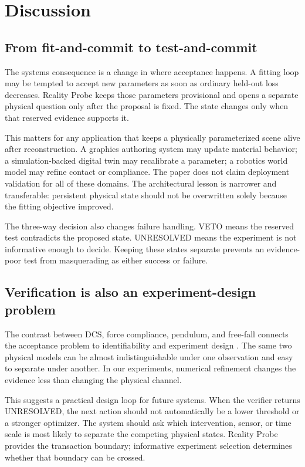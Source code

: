 \documentclass[acmtog]{acmart}
\begin{document}
\section{Discussion}\label{discussion}

\subsection{From fit-and-commit to test-and-commit}\label{why-the-channels-behave-differently}

The systems consequence is a change in where acceptance happens. A fitting loop may be tempted to accept new parameters as soon as ordinary held-out loss decreases. Reality Probe keeps those parameters provisional and opens a separate physical question only after the proposal is fixed. The state changes only when that reserved evidence supports it.

This matters for any application that keeps a physically parameterized scene alive after reconstruction. A graphics authoring system may update material behavior; a simulation-backed digital twin may recalibrate a parameter; a robotics world model may refine contact or compliance. The paper does not claim deployment validation for all of these domains. The architectural lesson is narrower and transferable: persistent physical state should not be overwritten solely because the fitting objective improved.

The three-way decision also changes failure handling. VETO means the reserved test contradicts the proposed state. UNRESOLVED means the experiment is not informative enough to decide. Keeping these states separate prevents an evidence-poor test from masquerading as either success or failure.

\subsection{Verification is also an experiment-design problem}\label{relation-to-identifiability-and-experiment-design}

The contrast between DCS, force compliance, pendulum, and free-fall connects the acceptance problem to identifiability and experiment design \citep{wang2026identifiability,asadi2025oed}. The same two physical models can be almost indistinguishable under one observation and easy to separate under another. In our experiments, numerical refinement changes the evidence less than changing the physical channel.

This suggests a practical design loop for future systems. When the verifier returns UNRESOLVED, the next action should not automatically be a lower threshold or a stronger optimizer. The system should ask which intervention, sensor, or time scale is most likely to separate the competing physical states. Reality Probe provides the transaction boundary; informative experiment selection determines whether that boundary can be crossed.
\end{document}
